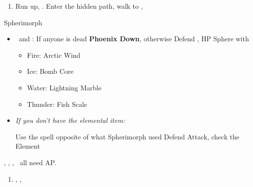 \begin{enumerate}[resume]
    \item Run up, \sd. Enter the hidden path, walk to \auron, \sd
\end{enumerate}
\bothvfill\winvfill\lossvfill
\begin{battle}[12000]{Spherimorph}
    \begin{itemize}
        \tidusf Change Weapon to Sonic Steel
        \tidusf Defend
        \switch{\tidus}{\rikku}
        \rikkuf Grenade, check the Element
        \item \kimahri\ and \yuna: If anyone is dead \textbf{Phoenix Down}, otherwise Defend
        \rikkuf \od, HP Sphere with
        \begin{itemize}
            \item Fire: Arctic Wind
            \item Ice: Bomb Core
            \item Water: Lightning Marble
            \item Thunder: Fish Scale
        \end{itemize}
        \item \textit{If you don't have the elemental item:}
        \begin{itemize}
            \switch{\rikku}{\lulu}
            \luluf Use the spell opposite of what Spherimorph used
            \yunaf Defend
            \kimahrif Attack, check the Element
            \switch{\lulu}{\rikku}
            \rikkuf \od
        \end{itemize}
    \end{itemize}
    \tidus, \yuna, \kimahri, \rikku\ all need AP.
\end{battle}
\begin{enumerate}[resume]
    \item \cs[1:50], \sd, \sd
\end{enumerate}
\colend
